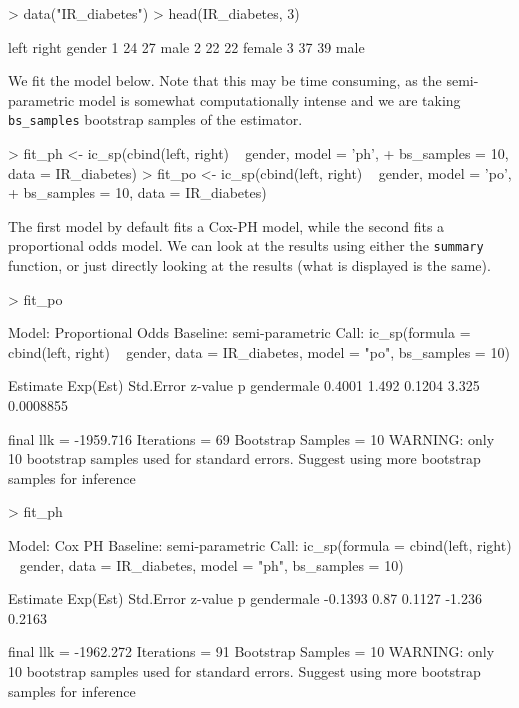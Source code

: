 \documentclass[a4paper]{article}
\begin{document}
\begin{Schunk}
\begin{Sinput}
> data("IR_diabetes")
> head(IR_diabetes, 3)
\end{Sinput}
\begin{Soutput}
  left right gender
1   24    27   male
2   22    22 female
3   37    39   male
\end{Soutput}
\end{Schunk}
  
We fit the model below. Note that this may be time consuming, as the semi-parametric model is somewhat computationally intense and we are taking \texttt{bs\_samples} bootstrap samples of the estimator. 
  
\begin{Schunk}
\begin{Sinput}
>   fit_ph <- ic_sp(cbind(left, right) ~ gender, model = 'ph', 
+                   bs_samples = 10, data = IR_diabetes)
>   fit_po <- ic_sp(cbind(left, right) ~ gender, model = 'po',
+                   bs_samples = 10, data = IR_diabetes)
\end{Sinput}
\end{Schunk}

The first model by default fits a Cox-PH model, while the second fits a proportional odds model. We can look at the results using either the \texttt{summary} function, or just directly looking at the results (what is displayed is the same). 
  
\begin{Schunk}
\begin{Sinput}
>   fit_po
\end{Sinput}
\begin{Soutput}
Model:  Proportional Odds
Baseline:  semi-parametric 
Call: ic_sp(formula = cbind(left, right) ~ gender, data = IR_diabetes, 
    model = "po", bs_samples = 10)

           Estimate Exp(Est) Std.Error z-value         p
gendermale   0.4001    1.492    0.1204   3.325 0.0008855

final llk =  -1959.716 
Iterations =  69 
Bootstrap Samples =  10 
WARNING: only  10  bootstrap samples used for standard errors. 
Suggest using more bootstrap samples for inference
\end{Soutput}
\begin{Sinput}
>   fit_ph
\end{Sinput}
\begin{Soutput}
Model:  Cox PH
Baseline:  semi-parametric 
Call: ic_sp(formula = cbind(left, right) ~ gender, data = IR_diabetes, 
    model = "ph", bs_samples = 10)

           Estimate Exp(Est) Std.Error z-value      p
gendermale  -0.1393     0.87    0.1127  -1.236 0.2163

final llk =  -1962.272 
Iterations =  91 
Bootstrap Samples =  10 
WARNING: only  10  bootstrap samples used for standard errors. 
Suggest using more bootstrap samples for inference
\end{Soutput}
\end{Schunk}
\end{document}
